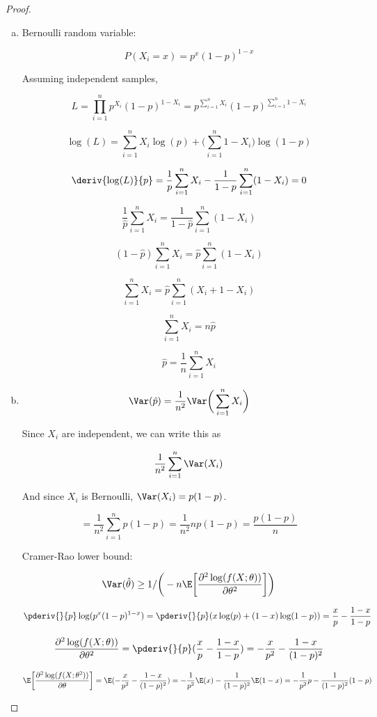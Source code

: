 \begin{proof}

\begin{enumerate}[a.]

\item Bernoulli random variable:

\[
P(X_i = x) = p^x(1-p)^{1-x}
\]

Assuming independent samples,

\[
L = \prod_{i=1}^n p^{X_i}(1-p)^{1-X_i} = p^{\sum_{i=1}^nX_i}(1-p)^{\sum_{i=1}^n1 - X_i}
\]

\[
\log(L) = \sum_{i=1}^nX_i \log(p) + \bigg( \sum_{i=1}^n1 - X_i \bigg) \log(1-p)
\]

\[
\deriv{\log(L)}{p} = \frac{1}{p}\sum_{i=1}^nX_i - \frac{1}{1-p} \sum_{i=1}^n (1 - X_i) = 0
\]

\[
\frac{1}{\hat{p}}\sum_{i=1}^nX_i  = \frac{1}{1-\hat{p}} \sum_{i=1}^n (1 - X_i)
\]

\[
(1-\hat{p})\sum_{i=1}^nX_i = \hat{p} \sum_{i=1}^n (1 - X_i)
\]

\[
\sum_{i=1}^n X_i  = \hat{p}\sum_{i=1}^n (X_i + 1 - X_i)
\]

\[
\sum_{i=1}^n X_i  = n \hat{p}
\]

\[
\boxed{
\hat{p} = \frac{1}{n} \sum_{i=1}^n X_i}
\]

\item 

\[
\Var(\hat{p}) = \frac{1}{n^2} \Var\bigg( \sum_{i=1}^n X_i\bigg)
\]

Since \(X_i\) are independent, we can write this as

\[
\frac{1}{n^2} \sum_{i=1}^n \Var(X_i)
\]

And since \(X_i\) is Bernoulli, \(\Var(X_i) = p(1-p)\).

\[
= \frac{1}{n^2} \sum_{i=1}^n p(1-p) = \frac{1}{n^2} n p(1-p) = \boxed{\frac{p(1-p)}{n}}
\]


Cramer-Rao lower bound:

\[
\Var(\hat{\theta}) \geq 1/\bigg(-n \E \bigg[ \frac{\partial^2 \log(f(X; \theta))}{\partial \theta^2} \bigg] \bigg)
\]

\[
\pderiv{}{p} \log(p^x(1-p)^{1-x}) = \pderiv{}{p} (x\log(p) + (1-x)\log(1-p)) = \frac{x}{p} - \frac{1-x}{1-p}
\]

\[
 \frac{\partial^2 \log(f(X; \theta))}{\partial \theta^2} = \pderiv{}{p}(\frac{x}{p} - \frac{1-x}{1-p}) = -\frac{x}{p^2} - \frac{1-x}{(1-p)^2}
\]

\[
\E \bigg[  \frac{\partial^2 \log(f(X; \theta^2))}{\partial \theta}  \bigg] = \E(-\frac{x}{p^2} - \frac{1-x}{(1-p)^2}) =  -\frac{1}{p^2} \E(x) - \frac{1}{(1-p)^2} \E(1-x) = -\frac{1}{p^2}p - \frac{1}{(1-p)^2}(1 - p)
\]


\end{enumerate}
\end{proof}
